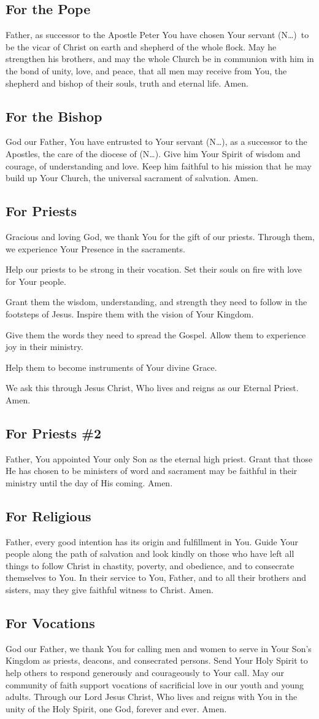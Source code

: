 \documentclass[12pt]{article}
\newcommand{\prayertitle}[1]{\subsection{#1}}
\newcommand{\insertname}{(N\dots)\xspace}
\begin{document}
\prayertitle{For the Pope}
Father, as successor to the Apostle Peter You have chosen Your servant \insertname\ to be the vicar of Christ on earth and shepherd of the whole flock.
May he strengthen his brothers, and may the whole Church be in communion with him in the bond of unity, love, and peace, that all men may receive from You, the shepherd and bishop of their souls, truth and eternal life.
Amen.
\newpage
\prayertitle{For the Bishop}
God our Father, You have entrusted to Your servant \insertname, as a successor to the Apostles, the care of the diocese of \insertname.
Give him Your Spirit of wisdom and courage, of understanding and love.
Keep him faithful to his mission that he may build up Your Church, the universal sacrament of salvation.
Amen.

\prayertitle{For Priests}
Gracious and loving God, we thank You for the gift of our priests.
Through them, we experience Your Presence in the sacraments.

Help our priests to be strong in their vocation.
Set their souls on fire with love for Your people.

Grant them the wisdom, understanding, and strength they need to follow in the footsteps of Jesus.
Inspire them with the vision of Your Kingdom.

Give them the words they need to spread the Gospel.
Allow them to experience joy in their ministry.

Help them to become instruments of Your divine Grace.

We ask this through Jesus Christ, Who lives and reigns as our Eternal Priest.
Amen.

\prayertitle{For Priests \#2}
Father, You appointed Your only Son as the eternal high priest.
Grant that those He has chosen to be ministers of word and sacrament may be faithful in their ministry until the day of His coming.
Amen.

\prayertitle{For Religious}
Father, every good intention has its origin and fulfillment in You.
Guide Your people along the path of salvation and look kindly on those who have left all things to follow Christ in chastity, poverty, and obedience, and to consecrate themselves to You.
In their service to You, Father, and to all their brothers and sisters, may they give faithful witness to Christ.
Amen.

\prayertitle{For Vocations}
God our Father, we thank You for calling men and women to serve in Your Son's Kingdom as priests, deacons, and consecrated persons.
Send Your Holy Spirit to help others to respond generously and courageously to Your call.
May our community of faith support vocations of sacrificial love in our youth and young adults.
Through our Lord Jesus Christ, Who lives and reigns with You in the unity of the Holy
Spirit, one God, forever and ever.
Amen.
\end{document}
